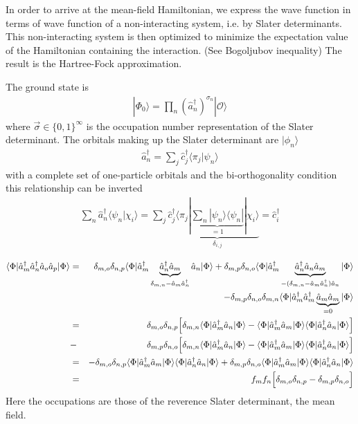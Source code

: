 \documentclass[11pt,a4paper]{report}
\begin{document}
In order to arrive at the mean-field Hamiltonian, we express the wave
function in terms of wave function of a non-interacting system,
i.e. by Slater determinants. This non-interacting system is then
optimized to minimize the expectation value of the Hamiltonian
containing the interaction. (See Bogoljubov inequality) The result is
the Hartree-Fock approximation.

The ground state is
\begin{eqnarray}
|\Phi_0\rangle=
\prod_n \left(\hat{a}_n^\dagger\right)^{\sigma_n}|\mathcal{O}\rangle
\end{eqnarray}
where $\vec{\sigma}\in\{0,1\}^\infty$ is the occupation number
representation of the Slater determinant.  The orbitals making up the
Slater determinant are $|\phi_n\rangle$
\begin{eqnarray}
\hat{a}_n^\dagger=\sum_j\hat{c}^\dagger_j\langle\pi_j|\psi_n\rangle
\end{eqnarray}
with a complete set of one-particle orbitals and the bi-orthogonality
condition this relationship can be inverted
\begin{eqnarray}
\sum_n\hat{a}_n^\dagger\langle\psi_n|\chi_i\rangle
=\sum_j\hat{c}^\dagger_j
\underbrace{\langle\pi_j|
\underbrace{\sum_n|\psi_n\rangle\langle\psi_n|}_{=1}|\chi_i\rangle}_{\delta_{i,j}}
=\hat{c}^\dagger_i
\end{eqnarray}

\begin{eqnarray}
\langle \Phi|\hat{a}^\dagger_m\hat{a}^\dagger_n\hat{a}_o\hat{a}_p|\Phi\rangle
&=&\delta_{m,o}\delta_{n,p}
\langle \Phi|\hat{a}^\dagger_m
\underbrace{\hat{a}^\dagger_n\hat{a}_m}_{\delta_{m,n}-\hat{a}_m\hat{a}^\dagger_n}
\hat{a}_n
|\Phi\rangle
+\delta_{m,p}\delta_{n,o}
\langle \Phi|\hat{a}^\dagger_m\underbrace{\hat{a}^\dagger_n\hat{a}_n\hat{a}_m
}_{-(\delta_{m,n}-\hat{a}_m\hat{a}^\dagger_n)\hat{a}_n}
|\Phi\rangle
\nonumber\\
&&-\delta_{m,p}\delta_{n,o}\delta_{m,n}
\langle \Phi|\hat{a}^\dagger_m\hat{a}^\dagger_m\underbrace{\hat{a}_m\hat{a}_m}
_{=0}|\Phi\rangle
\nonumber\\
&=& \delta_{m,o}\delta_{n,p}
\Bigl[
\delta_{m,n}\langle \Phi|\hat{a}^\dagger_m
\hat{a}_n|\Phi\rangle
-
\langle \Phi|\hat{a}^\dagger_m
\hat{a}_m|\Phi\rangle\langle \Phi|\hat{a}^\dagger_n
\hat{a}_n|\Phi\rangle\Bigr]
\nonumber\\
&-& \delta_{m,p}\delta_{n,o}
\Bigl[
\delta_{m,n}\langle \Phi|\hat{a}^\dagger_m
\hat{a}_n|\Phi\rangle
-
\langle \Phi|\hat{a}^\dagger_m
\hat{a}_m|\Phi\rangle\langle \Phi|\hat{a}^\dagger_n
\hat{a}_n|\Phi\rangle\Bigr]
\nonumber\\
&=& -\delta_{m,o}\delta_{n,p}
\langle \Phi|\hat{a}^\dagger_m
\hat{a}_m|\Phi\rangle\langle \Phi|\hat{a}^\dagger_n
\hat{a}_n|\Phi\rangle
+ \delta_{m,p}\delta_{n,o}
\langle \Phi|\hat{a}^\dagger_m
\hat{a}_m|\Phi\rangle\langle \Phi|\hat{a}^\dagger_n
\hat{a}_n|\Phi\rangle
\nonumber\\
&=&f_mf_n\Bigl[\delta_{m,o}\delta_{n,p}-\delta_{m,p}\delta_{n,o}\Bigr]
\end{eqnarray}
Here the occupations are those of the reverence Slater determinant,
the mean field.
\end{document}
